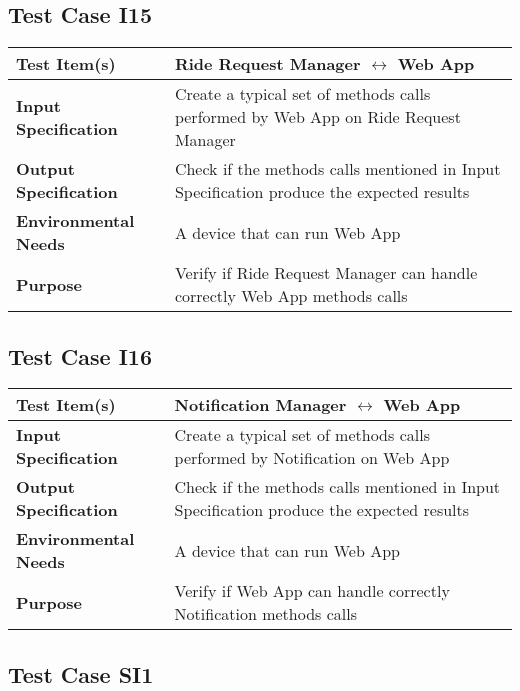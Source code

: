   
      
      \subsection{Test Case I15}
      
      	\begin{tabular}{p{} p{}}
      		\hline
      		\textbf{Test Item(s)} & Ride Request Manager $ \longleftrightarrow $   Web App\\
      		\hline
      		\textbf{Input Specification} & Create a typical set of methods calls performed by Web App on Ride Request Manager\\
      		\hline
      		\textbf{Output Specification} & Check if the methods calls mentioned in Input Specification produce the expected results\\
		    \hline
			\textbf{Environmental Needs} &  A device that can run Web App\\
			\hline
      		\textbf{Purpose} & Verify if Ride Request Manager can handle correctly Web App methods calls \\
      		\hline
      	\end{tabular}
      
      
  
  
  \subsection{Test Case I16}
  
  	\begin{tabular}{p{} p{}}
  		\hline
  		\textbf{Test Item(s)} & Notification Manager $ \longleftrightarrow $   Web App\\
  		\hline
  		\textbf{Input Specification} & Create a typical set of methods calls performed by Notification on Web App\\
  		\hline
  		\textbf{Output Specification} & Check if the methods calls mentioned in Input Specification produce the expected results\\
  		\hline
		\textbf{Environmental Needs} &  A device that can run Web App\\
  		\hline
  		\textbf{Purpose} & Verify if Web App can handle correctly Notification methods calls \\
  		\hline
  	\end{tabular}
  

   \subsection{Test Case SI1}
   
